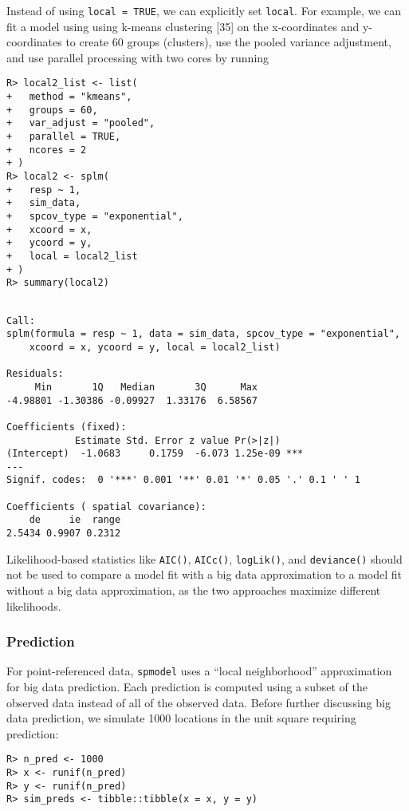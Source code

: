 \documentclass[10pt,letterpaper]{article}
\begin{document}
Instead of using \texttt{local\ =\ TRUE}, we can explicitly set
\texttt{local}. For example, we can fit a model using using k-means
clustering {[}35{]} on the x-coordinates and y-coordinates to create 60
groups (clusters), use the pooled variance adjustment, and use parallel
processing with two cores by running

\begin{verbatim}
R> local2_list <- list(
+   method = "kmeans",
+   groups = 60,
+   var_adjust = "pooled",
+   parallel = TRUE,
+   ncores = 2
+ )
R> local2 <- splm(
+   resp ~ 1,
+   sim_data,
+   spcov_type = "exponential",
+   xcoord = x,
+   ycoord = y,
+   local = local2_list
+ )
R> summary(local2)
\end{verbatim}

\begin{verbatim}

Call:
splm(formula = resp ~ 1, data = sim_data, spcov_type = "exponential", 
    xcoord = x, ycoord = y, local = local2_list)

Residuals:
     Min       1Q   Median       3Q      Max 
-4.98801 -1.30386 -0.09927  1.33176  6.58567 

Coefficients (fixed):
            Estimate Std. Error z value Pr(>|z|)    
(Intercept)  -1.0683     0.1759  -6.073 1.25e-09 ***
---
Signif. codes:  0 '***' 0.001 '**' 0.01 '*' 0.05 '.' 0.1 ' ' 1

Coefficients ( spatial covariance):
    de     ie  range 
2.5434 0.9907 0.2312 
\end{verbatim}

Likelihood-based statistics like \texttt{AIC()}, \texttt{AICc()},
\texttt{logLik()}, and \texttt{deviance()} should not be used to compare
a model fit with a big data approximation to a model fit without a big
data approximation, as the two approaches maximize different
likelihoods.

\hypertarget{sec:predict}{%
\subsubsection{Prediction}\label{sec:predict}}

For point-referenced data, \texttt{spmodel} uses a ``local
neighborhood'' approximation for big data prediction. Each prediction is
computed using a subset of the observed data instead of all of the
observed data. Before further discussing big data prediction, we
simulate 1000 locations in the unit square requiring prediction:

\begin{verbatim}
R> n_pred <- 1000
R> x <- runif(n_pred)
R> y <- runif(n_pred)
R> sim_preds <- tibble::tibble(x = x, y = y)
\end{verbatim}
\end{document}
